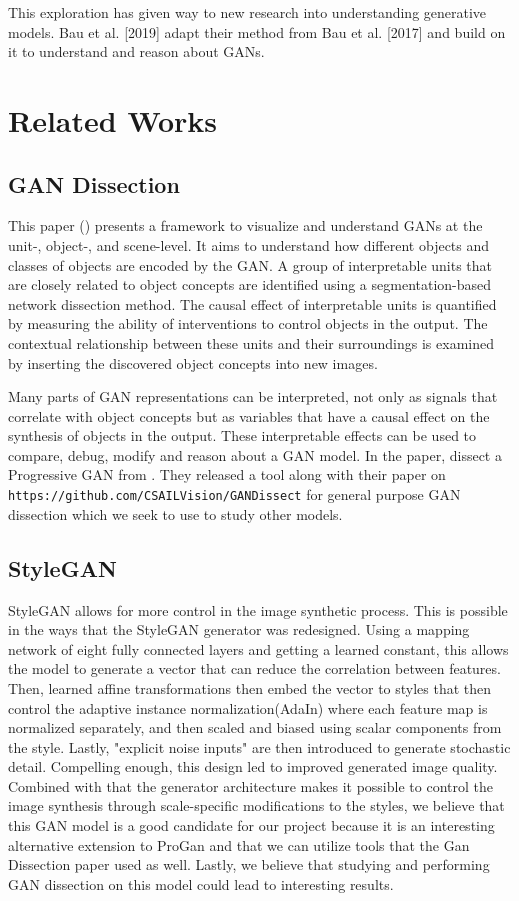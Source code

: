 \documentclass{article}
\begin{document}
This exploration has given way to new research into understanding generative models. Bau et al. [2019] adapt their method from Bau et al. [2017] and build on it to understand and reason about GANs. 

\section{Related Works}

\subsection{GAN Dissection}
This paper (\cite{gandissect}) presents a framework to visualize and understand GANs at the unit-, object-, and scene-level. It aims to understand how different objects and classes of objects are encoded by the GAN. A group of interpretable units that are closely related to object concepts are identified using a segmentation-based network dissection method. The causal effect of interpretable units is quantified by measuring the ability of interventions to control objects in the output. The contextual relationship between these units and their surroundings is examined by inserting the discovered object concepts into new images. 

Many parts of GAN representations can be interpreted, not only as signals that correlate with object concepts but as variables that have a causal effect on the synthesis of objects in the output. These interpretable effects can be used to compare, debug, modify and reason about a GAN model. In the paper, \cite{gandissect} dissect a Progressive GAN from \cite{progan}. They released a tool along with their paper on \texttt{https://github.com/CSAILVision/GANDissect} for general purpose GAN dissection which we seek to use to study other models.

\subsection{StyleGAN}
 StyleGAN \cite{stylegan} allows for more control in the image synthetic process. This is possible in the ways that the StyleGAN generator was redesigned. Using a mapping network of eight fully connected layers and getting a learned constant, this allows the model to generate a vector that can reduce the correlation between features. Then, learned affine transformations then embed the vector to styles that then control the adaptive instance normalization(AdaIn) where each feature map is normalized separately, and then scaled and biased using scalar components from the style. Lastly, "explicit noise inputs" are then introduced to generate stochastic detail. Compelling enough, this design led to improved generated image quality. Combined with that the generator architecture makes it possible to control the image synthesis through scale-specific modifications to the styles, we believe that this GAN model is a good candidate for our project because it is an interesting alternative extension to ProGan and that we can utilize tools that the Gan Dissection paper used as well. Lastly, we believe that studying and performing GAN dissection on this model could lead to interesting results.
\end{document}
